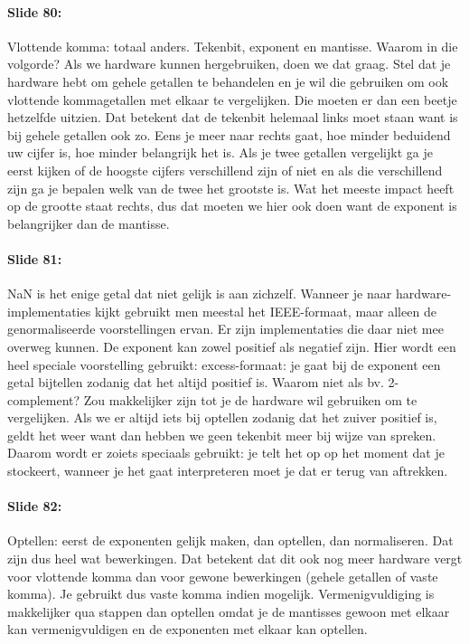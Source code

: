\documentclass[10pt,a4paper]{book}
\begin{document}
\paragraph{Slide 80:} Vlottende komma: totaal anders. Tekenbit, exponent en mantisse. Waarom in die volgorde? Als we hardware kunnen hergebruiken, doen we dat graag. Stel dat je hardware hebt om gehele getallen te behandelen en je wil die gebruiken om ook vlottende kommagetallen met elkaar te vergelijken. Die moeten er dan een beetje hetzelfde uitzien. Dat betekent dat de tekenbit helemaal links moet staan want is bij gehele getallen ook zo. Eens je meer naar rechts gaat, hoe minder beduidend uw cijfer is, hoe minder belangrijk het is. Als je twee getallen vergelijkt ga je eerst kijken of de hoogste cijfers verschillend zijn of niet en als die verschillend zijn ga je bepalen welk van de twee het grootste is. Wat het meeste impact heeft op de grootte staat rechts, dus dat moeten we hier ook doen want de exponent is belangrijker dan de mantisse.

\paragraph{Slide 81:} NaN is het enige getal dat niet gelijk is aan zichzelf. Wanneer je naar hardware-implementaties kijkt gebruikt men meestal het IEEE-formaat, maar alleen de genormaliseerde voorstellingen ervan. Er zijn implementaties die daar niet mee overweg kunnen. De exponent kan zowel positief als negatief zijn. Hier wordt een heel speciale voorstelling gebruikt: excess-formaat: je gaat bij de exponent een getal bijtellen zodanig dat het altijd positief is. Waarom niet als bv. 2-complement? Zou makkelijker zijn tot je de hardware wil gebruiken om te vergelijken. Als we er altijd iets bij optellen zodanig dat het zuiver positief is, geldt het weer want dan hebben we geen tekenbit meer bij wijze van spreken. Daarom wordt er zoiets speciaals gebruikt: je telt het op op het moment dat je stockeert, wanneer je het gaat interpreteren moet je dat er terug van aftrekken.

\paragraph{Slide 82:} Optellen: eerst de exponenten gelijk maken, dan optellen, dan normaliseren. Dat zijn dus heel wat bewerkingen. Dat betekent dat dit ook nog meer hardware vergt voor vlottende komma dan voor gewone bewerkingen (gehele getallen of vaste komma). Je gebruikt dus vaste komma indien mogelijk. Vermenigvuldiging is makkelijker qua stappen dan optellen omdat je de mantisses gewoon met elkaar kan vermenigvuldigen en de exponenten met elkaar kan optellen. 
\end{document}
